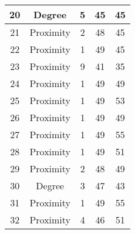 \documentclass[results.tex]{subfiles}
\begin{document}
\begin{center}
\begin{tabular}{| c || c | c | c | c |}
            \hline
            20                      & Degree                       & 5                      & 45                      & 45                   \\
            \hline
            21                      & Proximity                    & 2                      & 48                      & 45                   \\
            \hline
            22                      & Proximity                    & 1                      & 49                      & 45                   \\
            \hline
            23                      & Proximity                    & 9                      & 41                      & 35                   \\
            \hline
            24                      & Proximity                    & 1                      & 49                      & 49                   \\
            \hline
            25                      & Proximity                    & 1                      & 49                      & 53                   \\
            \hline
            26                      & Proximity                    & 1                      & 49                      & 49                   \\
            \hline
            27                      & Proximity                    & 1                      & 49                      & 55                   \\
            \hline
            28                      & Proximity                    & 1                      & 49                      & 51                   \\
            \hline
            29                      & Proximity                    & 2                      & 48                      & 49                   \\
            \hline
            30                      & Degree                       & 3                      & 47                      & 43                   \\
            \hline
            31                      & Proximity                    & 1                      & 49                      & 55                   \\
            \hline
            32                      & Proximity                    & 4                      & 46                      & 51                   \\

\end{tabular}
\end{center}
\end{document}
